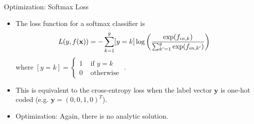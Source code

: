 \begin{frame} {Optimization: Softmax Loss}
  \begin{itemize}
\vspace{5mm}
\item The loss function for a softmax classifier is
$$L(y, f(\mathbf{x})) = - \sum_{k = 1}^g [y = k] \log \left( \frac{\exp(f_{in,k})}{\sum_{k'=1}^g\exp(f_{in,k'})}\right)$$
where $[y = k] = \begin{cases} 1 & \text{ if } y = k \\
0 & \text{ otherwise }
\end{cases}$. 
\vspace{5mm}
\item This is equivalent to the cross-entropy loss when the label vector $\bm{y}$ is one-hot coded (e.g. $\mathbf{y} = (0,0,1,0)^T$). 
\item Optimization:  Again, there is no analytic solution.
\end{itemize}
\end{frame}

\endlecture
